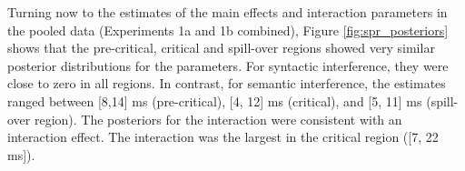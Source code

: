 \documentclass[a4paper, man, floatsintext]{apa7}
\begin{document}





Turning now to the estimates of the main effects and interaction parameters in the pooled data (Experiments 1a and 1b combined), Figure \ref{fig:spr_posteriors} shows that the pre-critical, critical and spill-over regions showed very similar posterior distributions for the parameters. For syntactic interference, they were close to zero in all regions. In contrast, for semantic interference, the estimates ranged between [8,14] ms (pre-critical), [4, 12] ms (critical), and [5, 11] ms (spill-over region). The posteriors for the interaction were consistent with an interaction effect. The interaction was the  largest in the critical region ([7, 22 ms]). 
\end{document}
